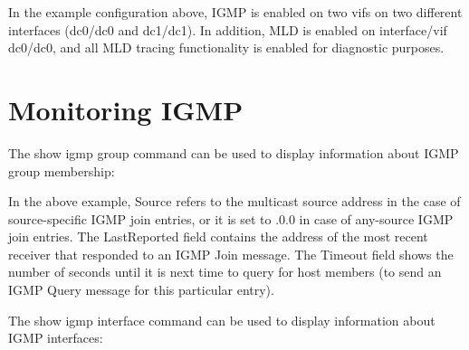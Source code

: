 \vspace{0.1in} In the example configuration above, IGMP is enabled on
two vifs on two different interfaces ({\stt dc0/dc0} and {\stt
dc1/dc1}).  In addition, MLD is enabled on interface/vif {\stt
dc0/dc0}, and all MLD tracing functionality is enabled for diagnostic
purposes.

\newpage
\section{Monitoring IGMP}

The {\stt show igmp group} command can be used to display
information about IGMP group membership:

\vspace{0.1in}
\noindent{}
\vspace{0.1in}

In the above example, {\stt Source} refers to the multicast source
address in the case of source-specific IGMP join entries, or it is set
to {.0.0} in case of any-source IGMP join entries.  The {\stt
LastReported} field contains the address of the most recent receiver
that responded to an IGMP Join message.  The {\stt Timeout} field
shows the number of seconds until it is next time to query for host
members (\ie to send an IGMP Query message for this particular entry).

\vspace{0.1in}
The {\stt show igmp interface} command can be used to display
information about IGMP interfaces:

